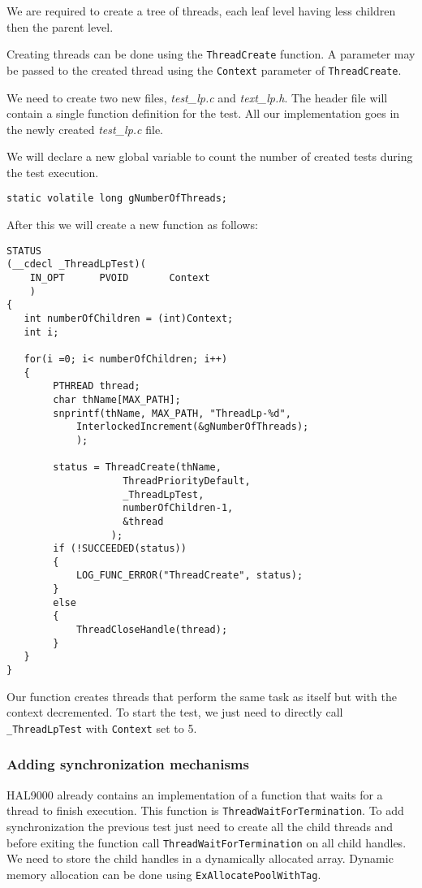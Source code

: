 We are required to create a tree of threads, each leaf level having less children then the parent level. 

Creating threads can be done using the \lstinline|ThreadCreate| function. A parameter may be passed to the created thread using the \lstinline|Context| parameter of \lstinline|ThreadCreate|.


We need to create two new files, \textit{test\_lp.c} and \textit{text\_lp.h}. The header file will contain a single function definition for the test.  All our implementation goes in the newly created \textit{test\_lp.c} file. 

We will declare a new global variable to count the number of created tests during the test execution. 
\begin{lstlisting}
static volatile long gNumberOfThreads;
\end{lstlisting}

After this we will create a new function as follows:
\begin{lstlisting}
STATUS
(__cdecl _ThreadLpTest)(
    IN_OPT      PVOID       Context
    )
{
   int numberOfChildren = (int)Context;
   int i;

   for(i =0; i< numberOfChildren; i++)
   {
        PTHREAD thread;
        char thName[MAX_PATH];
        snprintf(thName, MAX_PATH, "ThreadLp-%d",
            InterlockedIncrement(&gNumberOfThreads);
            );

        status = ThreadCreate(thName,
                    ThreadPriorityDefault,
                    _ThreadLpTest,
                    numberOfChildren-1,
                    &thread
                  );
        if (!SUCCEEDED(status))
        {
            LOG_FUNC_ERROR("ThreadCreate", status);
        }
        else
        {
            ThreadCloseHandle(thread);
        }
   }
}
\end{lstlisting}

Our function creates threads that perform the same task as itself but with the context decremented. To start the test, we just need to directly call \lstinline|_ThreadLpTest| with \lstinline|Context| set to 5. 

\subsubsection{Adding synchronization mechanisms}

HAL9000 already contains an implementation of a function that waits for a thread to finish execution. This function is \lstinline|ThreadWaitForTermination|. To add synchronization the previous test just need to create all the child threads and before exiting the function call \lstinline|ThreadWaitForTermination| on all child handles. We need to store the child handles in a dynamically allocated array. Dynamic memory allocation can be done using \lstinline|ExAllocatePoolWithTag|.


